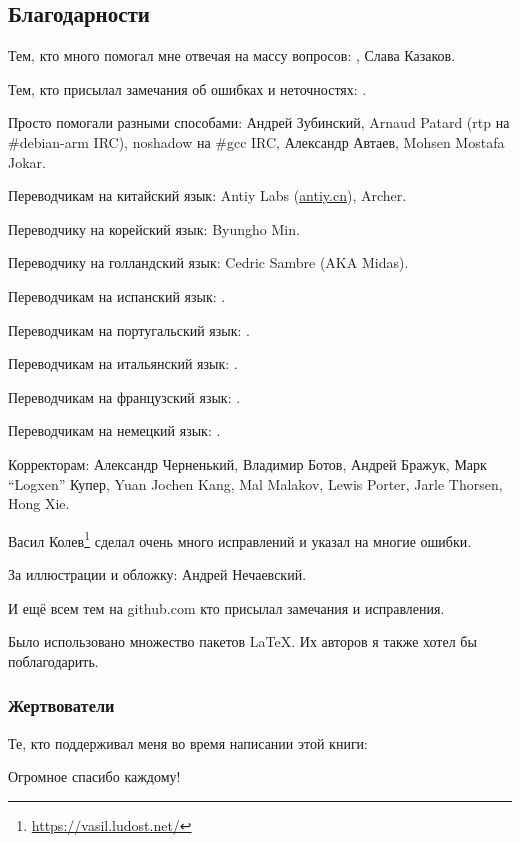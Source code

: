 \subsection*{Благодарности}

Тем, кто много помогал мне отвечая на массу вопросов: \HERMIT, Слава  Казаков.

Тем, кто присылал замечания об ошибках и неточностях: \PeopleMistakesInaccuracies{}.

Просто помогали разными способами:
Андрей Зубинский,
Arnaud Patard (rtp на \#debian-arm IRC),
noshadow на \#gcc IRC,
Александр Автаев,
Mohsen Mostafa Jokar.

Переводчикам на китайский язык:
Antiy Labs (\href{http://antiy.cn}{antiy.cn}), Archer.

Переводчику на корейский язык: Byungho Min.

Переводчику на голландский язык: Cedric Sambre (AKA Midas).

Переводчикам на испанский язык: \PeopleSpanishTranslators{}.

Переводчикам на португальский язык: \PeoplePTBRTranslators{}.

Переводчикам на итальянский язык: \PeopleItalianTranslators{}.

Переводчикам на французский язык: \PeopleFrenchTranslators{}.

Переводчикам на немецкий язык: \PeopleGermanTranslators{}.

Корректорам:
Александр  Черненький,
Владимир Ботов,
Андрей Бражук,
Марк ``Logxen'' Купер, Yuan Jochen Kang, Mal Malakov, Lewis Porter, Jarle Thorsen, Hong Xie.

Васил Колев\footnote{\url{https://vasil.ludost.net/}} сделал очень много исправлений и указал на многие ошибки.

За иллюстрации и обложку: Андрей Нечаевский.

И ещё всем тем на github.com кто присылал замечания и исправления\FNGithubContributors{}.

Было использовано множество пакетов \LaTeX. Их авторов я также хотел бы поблагодарить.

\subsubsection*{Жертвователи}

Те, кто поддерживал меня во время написании этой книги:



Огромное спасибо каждому!

